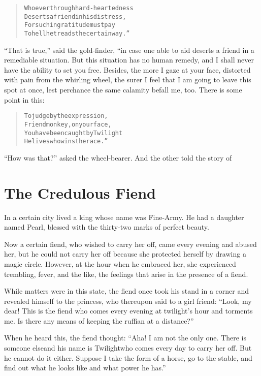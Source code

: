 \documentclass[article, twoside, 14pt]{memoir}
\renewenvironment{verbatim}{%
\begin{quote}%
\vskip -10pt%
\begin{alltt}\normalfont\large}{\end{alltt}%
\end{quote}%
\vskip -10pt
} %
\begin{document}
\begin{verbatim}
Whoever through hard-heartedness
Deserts a friend in his distress,
For such ingratitude must pay{\textemdash}
To hell he treads the certain way.”
\end{verbatim}
``That is true,'' said the gold-finder, “in case one able to aid
deserts a friend in a remediable situation. But this situation has
no human remedy, and I shall never have the ability to set you
free. Besides, the more I gaze at your face, distorted with pain
from the whirling wheel, the surer I feel that I am going to leave
this spot at once, lest perchance the same calamity befall me, too.
There is some point in this:

\begin{verbatim}
To judge by the expression,
    Friend monkey, on your face,
You have been caught by Twilight{\textemdash}
    He lives who wins the race.”
\end{verbatim}
``How was that?'' asked the wheel-bearer. And the other told the
story of

\chapter{The Credulous Fiend}

\label{s88}

In a certain city lived a king whose name was Fine-Army. He
had a daughter named Pearl, blessed with the thirty-two marks of
perfect beauty.

Now a certain fiend, who wished to carry her off, came every
evening and abused her, but he could not carry her off because she
protected herself by drawing a magic circle. However, at the hour
when he embraced her, she experienced trembling, fever, and the
like, the feelings that arise in the presence of a fiend.

While matters were in this state, the fiend once took his stand in
a corner and revealed himself to the princess, who thereupon said
to a girl friend:
``Look, my dear! This is the fiend who comes every evening at twilight's hour and torments me. Is there any means of keeping the ruffian at a distance?''

When he heard this, the fiend thought:
``Aha! I am not the only one. There is someone else{\textemdash}and his name is Twilight{\textemdash}who comes every day to carry her off. But he cannot do it either. Suppose I take the form of a horse, go to the stable, and find out what he looks like and what power he has.''
\end{document}
